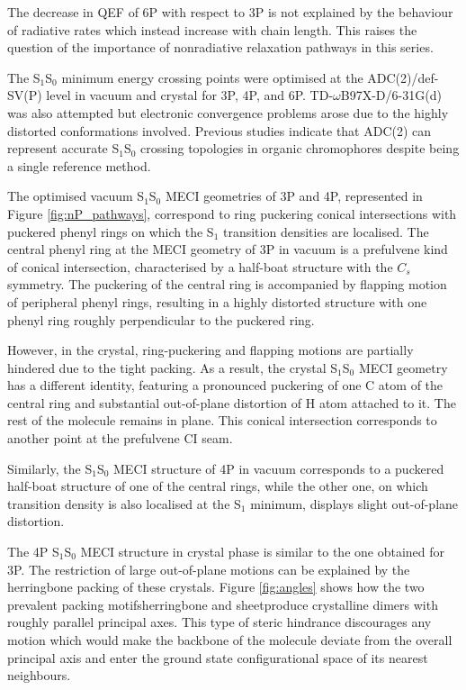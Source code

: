 The decrease in QEF of 6P with respect to 3P is not explained by the behaviour of radiative rates which instead increase with chain length. This raises the question of the importance of nonradiative relaxation pathways in this series. 


The S$_1$\textendash{}S$_0$ minimum energy crossing points were optimised at the ADC(2)/def-SV(P) level in vacuum and crystal for 3P, 4P, and 6P. TD-$\omega$B97X-D/6-31G(d) was also attempted but electronic convergence problems arose due to the highly distorted conformations involved. Previous studies indicate that ADC(2) can represent accurate S$_1$\textendash{}S$_0$ crossing topologies in organic chromophores despite being a single reference method.\cite{Tuna2015}

The optimised vacuum S$_1$\textendash{}S$_0$ MECI geometries of 3P and 4P, represented in Figure \ref{fig:nP_pathways}, correspond to ring puckering conical intersections with puckered phenyl rings on which the S$_1$ transition densities are localised. The central phenyl ring at the MECI geometry of 3P in vacuum is a prefulvene kind of conical intersection,\cite{Olivucci} characterised by a half-boat structure with the $C_s$ symmetry.
The puckering of the central ring is accompanied by flapping motion of peripheral phenyl rings, resulting in a highly distorted structure with one phenyl ring roughly perpendicular to the puckered ring.

However, in the crystal, ring-puckering and flapping motions are partially hindered due to the tight packing. As a result, the crystal S$_1$\textendash{}S$_0$ MECI geometry has a different identity, featuring a pronounced puckering of one C atom of the central ring and substantial out-of-plane distortion of H atom attached to it. The rest of the molecule remains in plane. This conical intersection corresponds to another point at the prefulvene CI seam.

Similarly, the S$_1$\textendash{}S$_0$ MECI structure of 4P in vacuum corresponds to a puckered half-boat structure of one of the central rings, while the other one, on which transition density is also localised at the S$_1$ minimum, displays slight out-of-plane distortion.

The 4P S$_1$\textendash{}S$_0$ MECI structure in crystal phase is similar to the one obtained for 3P. The restriction of large out-of-plane motions can be explained by the herringbone packing of these crystals. Figure \ref{fig:angles} shows how the two prevalent packing motifs\textemdash{}herringbone and sheet\textemdash{}produce crystalline dimers with roughly parallel principal axes. This type of steric hindrance discourages any motion which would make the backbone of the molecule deviate from the overall principal axis and enter the ground state configurational space of its nearest neighbours.

